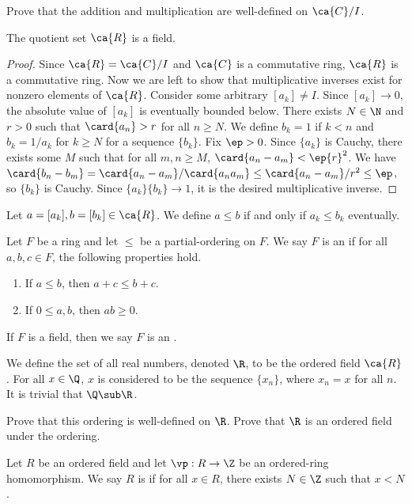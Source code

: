 \documentclass[10pt]{article}
\begin{document}
\begin{problem}
    Prove that the addition and multiplication are well-defined on $\ca{C}/I$.
\end{problem}
\begin{proposition}
    The quotient set $\ca{R}$ is a field.
\end{proposition}
\begin{proof}
    Since $\ca{R}=\ca{C}/I$ and $\ca{C}$ is a commutative ring, $\ca{R}$ is a commutative ring. Now we are left to show that multiplicative inverses exist for nonzero elements of $\ca{R}$. Consider some arbitrary $[{a}_{k}]\ne I$. Since $[{a}_{k}]\to 0$, the absolute value of $[{a}_{k}]$ is eventually bounded below. There exists $N\in\N$ and $r>0$ such that $\card{{a}_{n}}>r$ for all $n\ge N$. We define ${b}_{k}=1$ if $k<n$ and ${b}_{k}=1/{a}_{k}$ for $k\ge N$ for a sequence $\{{b}_{k}\}$. Fix $\ep>0$. Since $\{{a}_{k}\}$ is Cauchy, there exists some $M$ such that for all $m,n\ge M$, $\card{{a}_{n}-{a}_{m}}<\ep{r}^{2}$. We have $\card{{b}_{n}-{b}_{m}}=\card{{a}_{n}-{a}_{m}}/\card{{a}_{n}{a}_{m}}\le\card{{a}_{n}-{a}_{m}}/{r}^{2}\le\ep$, so $\{{b}_{k}\}$ is Cauchy. Since $\{{a}_{k}\}\{{b}_{k}\}\to 1$, it is the desired multiplicative inverse.
\end{proof}
\par
Let $a=[{a}_{k}],b=[{b}_{k}]\in\ca{R}$. We define $a\le b$ if and only if ${a}_{k}\le{b}_{k}$ eventually.
\begin{definition}
    Let $F$ be a ring and let $\le$ be a partial-ordering on $F$. We say $F$ is an  if for all $a,b,c\in F$, the following properties hold.
    \begin{enumerate}
        \item If $a\le b$, then $a+c\le b+c$.
        \item If $0\le a,b$, then $ab\ge 0$.
    \end{enumerate}
    If $F$ is a field, then we say $F$ is an .
\end{definition}
\par
We define the set of all real numbers, denoted $\R$, to be the ordered field $\ca{R}$. For all $x\in\Q$, $x$ is considered to be the sequence $\{{x}_{n}\}$, where ${x}_{n}=x$ for all $n$. It is trivial that $\Q\sub\R$.
\begin{problem}
    Prove that this ordering is well-defined on $\R$. Prove that $\R$ is an ordered field under the ordering.
\end{problem}
\begin{definition}
    Let $R$ be an ordered field and let $\vp:R\to\Z$ be an ordered-ring homomorphism. We say $R$ is  if for all $x\in R$, there exists $N\in\Z$ such that $x<N$.
\end{definition}
\end{document}
